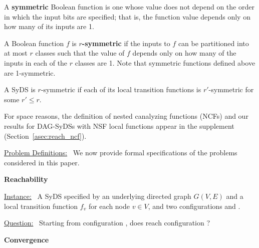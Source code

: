 A \textbf{symmetric} Boolean function is one whose
value does not depend on the order in
which the input bits are specified;
that is, the function value depends only on how many
of its inputs are 1.

A Boolean function $f$ is \textbf{$r$-symmetric}
if the inputs to $f$ can be partitioned into at most $r$ classes
such that the value of $f$ depends only on how many of the
inputs in each of the $r$ classes are 1.
Note that symmetric functions defined above are 1-symmetric.

A SyDS is $r$-symmetric
if each of its local transition
functions is $r'$-symmetric for some $r' \leq r$.

For space reasons, the definition of nested canalyzing
functions (NCFs) and our results for DAG-SyDSs
with NSF local functions appear in the supplement
(Section~\ref{asec:reach_ncf}).

\smallskip
\noindent
\underline{\textsf{Problem Definitions:}}~ We now provide
formal specifications of the problems considered in this paper.

\smallskip
\noindent
\textbf{Reachability} %

\smallskip
\noindent
\underline{\textsf{Instance:}}~ A SyDS \cals{} specified 
by an underlying directed
graph $G(V,E)$ and a local transition function $f_v$ for each node $v \in V$,
and two configurations \calc{} and \cald{}. 

\noindent
\underline{\textsf{Question:}}~ Starting from configuration \calc,
does \cals{} reach configuration \cald? 

\iffalse
We observe that \textsc{Reach} is solvable in polynomial time for
any class of SyDSs for which function evaluation can be done in
polynomial time and there is a polynomial bound on the length of a
phase space cycle and the length of a transient.  In such a case,
the given SyDS can be simulated for the required number of steps.
As will be seen, this approach is applicable to NCFs, monotone
functions (with both positive and negative monotone functions allowed
in \cals{}), and bithreshold functions.
\fi

\smallskip
\noindent
\textbf{Convergence} %

